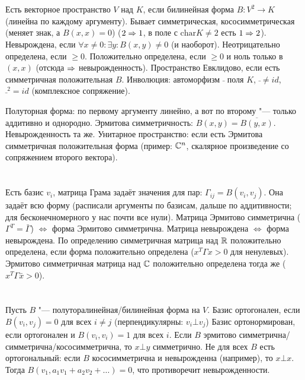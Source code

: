 \section{} %
Есть векторное пространство $V$ над $K$, если билинейная форма $B\colon V^2 \to K$ (линейна по каждому аргументу).
Бывает симметрическая, кососимметрическая (меняет знак, а $B(x,x)=0$) ($2 \Rightarrow 1$, в поле с $\mathrm{char} K \neq 2$ есть $1 \Rightarrow 2$).
Невырождена, если $\forall x \neq 0\colon \exists y\colon B(x,y)\neq 0$ (и наоборот).
Неотрицательно определена, если $\ge 0$.
Положительно определена, если $\ge 0$ и ноль только в $(x, x)$ (отсюда $\Rightarrow$ невырожденность).
Пространство Евклидово, если есть симметричная положительная $B$.
Инволюция: автоморфизм $\bar{}$ поля $K$, $\bar{} \neq id$, $\bar{}^2 = id$ (комплексное сопряжение).

Полуторная форма: по первому аргументу линейно, а вот по второму "--- только аддитивно и однородно.
Эрмитова симметричность: $B(x,y)=\overline{B(y,x)}$.
Невырожденность та же.
Унитарное пространство: если есть Эрмитова симметричная положительная форма (пример: $\mathbb{C}^n$, скалярное произведение со сопряжением второго вектора).

\section{} %
Есть базис $v_i$, матрица Грама задаёт значения для пар: $\Gamma_{ij}=B(v_i, v_j)$.
Она задаёт всю форму (расписали аргументы по базисам, дальше по аддитивности; для бесконечномерного у нас почти все нули).
Матрица Эрмитово симметрична ($\Gamma^T=\bar\Gamma$) $\iff$ форма Эрмитово симметрична.
Матрица невырождена $\iff$ форма невырождена.
\TODO[доказательство]
По определению симметричная матрица над $\mathbb{R}$ положительно определена, если форма положительно определена ($x^T\Gamma x > 0$ для ненулевых).
Эрмитово симметричная матрица над $\mathbb{C}$ положительно определена тогда же ($x^T\Gamma\bar x > 0$).

\section{} %
\TODO

\section{} %
Пусть $B$  "--- полуторалинейная/билинейная форма на $V$.
Базис ортогонален, если $B(v_i, v_j)=0$ для всех $i \neq j$ (перпендикулярны: $v_i \bot v_j$)
Базис ортонормирован, если ортогонален и $B(v_i, v_i)=1$ для всех $i$.
Если $B$ эрмитово симметрична/симметрична/кососимметрична, то $x \bot y$ симметрично.
Не для всех $B$ есть ортогональный: если $B$ кососимметрична и невырожденна (например), то $x \bot x$.
Тогда $B(v_1, a_1v_1+a_2v_2+\dots)=0$, что противоречит невырожденности.

